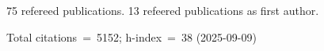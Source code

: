 75 refereed publications. 13 refeered publications as first author.

Total citations~=~5152; h-index~=~38 (2025-09-09)